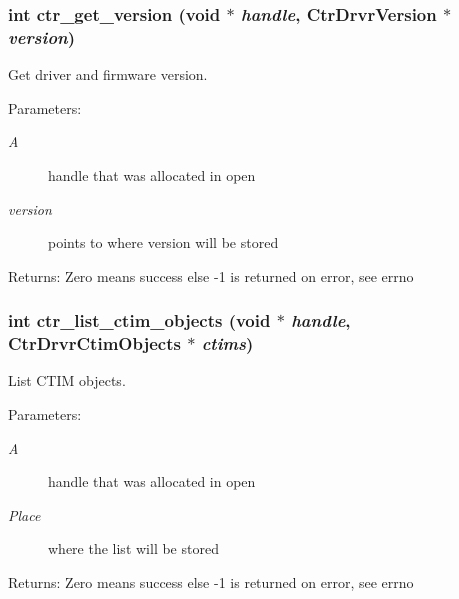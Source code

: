 \subsubsection{\setlength{\rightskip}{0pt plus 5cm}int ctr\_\-get\_\-version (void $\ast$ {\em handle}, Ctr\-Drvr\-Version $\ast$ {\em version})}\label{libctr_8doxygen_a0ceaeb987a40eceda3d47e3d399f5b0}


Get driver and firmware version. 

\begin{Desc}
\item[Parameters:]
\begin{description}
\item[{\em A}]handle that was allocated in open \item[{\em version}]points to where version will be stored \end{description}
\end{Desc}
\begin{Desc}
\item[Returns:]Zero means success else -1 is returned on error, see errno \end{Desc}
\subsubsection{\setlength{\rightskip}{0pt plus 5cm}int ctr\_\-list\_\-ctim\_\-objects (void $\ast$ {\em handle}, Ctr\-Drvr\-Ctim\-Objects $\ast$ {\em ctims})}\label{libctr_8doxygen_16f9fe47eb627e1efc1020c274f1a110}


List CTIM objects. 

\begin{Desc}
\item[Parameters:]
\begin{description}
\item[{\em A}]handle that was allocated in open \item[{\em Place}]where the list will be stored \end{description}
\end{Desc}
\begin{Desc}
\item[Returns:]Zero means success else -1 is returned on error, see errno \end{Desc}
